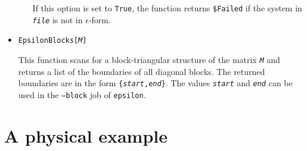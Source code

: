 \documentclass[12pt]{article}
\numberwithin{equation}{section}
\numberwithin{figure}{section}
\begin{document}
\begin{itemize}
\begin{itemize}
              If this option is set to \texttt{True}, the function returns \texttt{\$Failed} if the system in \texttt{\textit{file}} is not in $\epsilon$-form.
          \end{itemize}
        \item
          \texttt{EpsilonBlocks[\textit{M}]}

          This function scans for a block-triangular structure of the matrix \texttt{\textit{M}} and returns a list of the boundaries of all diagonal blocks.
          The returned boundaries are in the form \texttt{\{\textit{start},\textit{end}\}}.
          The values \texttt{\textit{start}} and \texttt{\textit{end}} can be used in the \texttt{--block} job of \texttt{epsilon}.
      \end{itemize}
  \section{A physical example} \label{sect:example}
\end{document}
